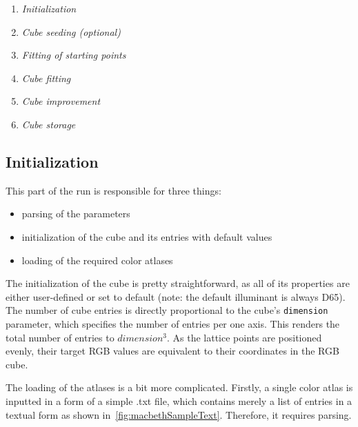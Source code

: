 \begin{enumerate}
	\item \emph{Initialization}
	\item \emph{Cube seeding (optional)}
	\item \emph{Fitting of starting points}
	\item \emph{Cube fitting}
	\item \emph{Cube improvement}
	\item \emph{Cube storage}
\end{enumerate}

\subsection{Initialization} \label{ssec:initialization}

This part of the run is responsible for three things:
\begin{itemize}
	\item parsing of the parameters
	\item initialization of the cube and its entries with default values
	\item loading of the required color atlases
\end{itemize}

The initialization of the cube is pretty straightforward, as all of its properties are either user-defined or set to default (note: the default illuminant is always D65). The number of cube entries is directly proportional to the cube's \texttt{dimension} parameter, which specifies the number of entries per one axis. This renders the total number of entries to $dimension^3$. As the lattice points are positioned evenly, their target RGB values are equivalent to their coordinates in the RGB cube.

The loading of the atlases is a bit more complicated. Firstly, a single color atlas is inputted in a form of a simple .txt file, which contains merely a list of entries in a textual form as shown in~\cref{fig:macbethSampleText}. Therefore, it requires parsing.

